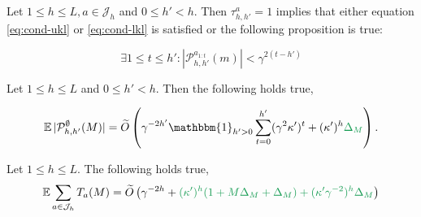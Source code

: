 \documentclass[runningheads, envcountsame, a4paper]{llncs}
\newcommand{\diff}[1]{\textcolor{ForestGreen}{#1}}
\begin{document}
\begin{lemma}
\label{lemma:size_Ph}
Let $1 \leq h \leq L,  a\in \mathcal{J}_h$ and $0\leq h'<h$. Then $\tau^a_{h,h'}=1$ implies that either equation \eqref{eq:cond-ukl} or \eqref{eq:cond-lkl} is satisfied or the following proposition is true:


\begin{equation}
    \label{eq:P-min-size}
    \exists 1\leq t \leq h': |\mathcal{P}_{h,h'}^{a_{1:t}}(m)| < \gamma^{2(t-h')}
\end{equation}
\end{lemma}

\begin{lemma}
\label{lemma:expected-P-size}
Let $1\leq h\leq L$ and $0 \leq h' < h$. Then the following holds true,

\begin{equation*}
    \expectedvalue |\mathcal{P}^\emptyset_{h,h'}(M)| = \tilde{O}\left(\gamma^{-2h'}\mathbbm{1}_{h'>0}\sum_{t=0}^{h'}(\gamma^2 \kappa')^t + (\kappa')^h\diff{\Delta_M} \right).
\end{equation*}
\end{lemma}

\begin{lemma}
\label{lemma:expected-plays-count}
Let $1\leq h\leq L$. The following holds true,
\begin{equation*}
    \expectedvalue \sum_{a\in \mathcal{J}_h} T_a(M) = \tilde{O}\left(\gamma^{-2h} + \diff{(\kappa')^h(1+M\Delta_M+\Delta_M) + (\kappa'\gamma^{-2})^h\Delta_M}\right)
\end{equation*}
\end{lemma}
\end{document}
